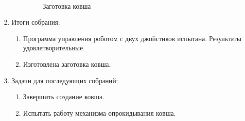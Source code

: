 \begin{enumerate}
\begin{enumerate}
	    \begin{figure}[H]
			\begin{minipage}[h]{0.2\linewidth}
				\center  
			\end{minipage}
			\begin{minipage}[h]{0.6\linewidth}
				\caption{Заготовка ковша}
			\end{minipage}
		\end{figure}
		
	\end{enumerate}
	
	\item Итоги собрания:
	\begin{enumerate}
		\item Программа управления роботом с двух джойстиков испытана. Результаты удовлетворительные.
		
		\item Изготовлена заготовка ковша.
		
	\end{enumerate}
	
	\item Задачи для последующих собраний:
	\begin{enumerate}
		\item Завершить создание ковша.
		
		\item Испытать работу механизма опрокидывания ковша.
		
	\end{enumerate}     
\end{enumerate}
\fillpage

